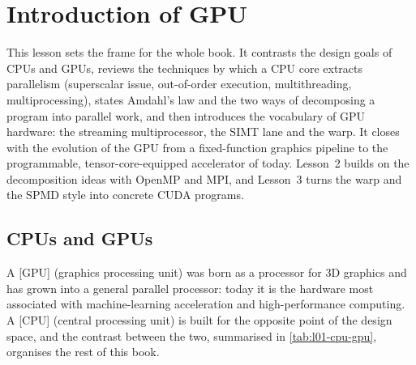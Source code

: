 \documentclass[../main.tex]{subfiles}
\begin{document}
\chapter{Introduction of GPU}

This lesson sets the frame for the whole book.  It contrasts the
design goals of CPUs and GPUs, reviews the techniques by which a CPU
core extracts parallelism (superscalar issue, out-of-order execution,
multithreading, multiprocessing), states Amdahl's law and the two ways of
decomposing a program into parallel work, and then introduces the
vocabulary of GPU hardware: the streaming multiprocessor, the SIMT lane
and the warp.  It closes with the evolution of the GPU from a
fixed-function graphics pipeline to the programmable, tensor-core-equipped
accelerator of today.  Lesson~2 builds on the decomposition ideas with
OpenMP and MPI, and Lesson~3 turns the warp and the SPMD style into
concrete CUDA programs.

\section{CPUs and GPUs}
\label{sec:l01-cpu-vs-gpu}

A [GPU] (graphics processing unit) was born as a processor
for 3D graphics and has grown into a general parallel processor: today
it is the hardware most associated with machine-learning acceleration and
high-performance computing.  A [CPU] (central processing unit) is
built for the opposite point of the design space, and the contrast
between the two, summarised in \cref{tab:l01-cpu-gpu}, organises the
rest of this book.
\end{document}
